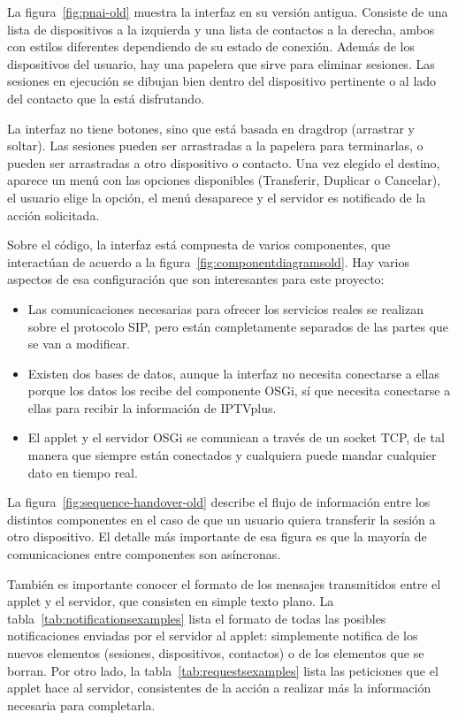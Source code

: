 La figura~\ref{fig:pnai-old} muestra la interfaz en su versión antigua.
Consiste de una lista de dispositivos a la izquierda y una lista de contactos a la derecha, ambos con estilos diferentes dependiendo de su estado de conexión.
Además de los dispositivos del usuario, hay una papelera que sirve para eliminar sesiones.
Las sesiones en ejecución se dibujan bien dentro del dispositivo pertinente o al lado del contacto que la está disfrutando.

La interfaz no tiene botones, sino que está basada en drag\et{}drop (arrastrar y soltar).
Las sesiones pueden ser arrastradas a la papelera para terminarlas, o pueden ser arrastradas a otro dispositivo o contacto.
Una vez elegido el destino, aparece un menú con las opciones disponibles (Transferir, Duplicar o Cancelar), el usuario elige la opción, el menú desaparece y el servidor es notificado de la acción solicitada.

Sobre el código, la interfaz está compuesta de varios componentes, que interactúan de acuerdo a la figura~\ref{fig:componentdiagramsold}.
Hay varios aspectos de esa configuración que son interesantes para este proyecto:

\begin{itemize}
  \item Las comunicaciones necesarias para ofrecer los servicios reales se realizan sobre el protocolo SIP, pero están completamente separados de las partes que se van a modificar.
  \item Existen dos bases de datos, aunque la interfaz no necesita conectarse a ellas porque los datos los recibe del componente OSGi, sí que necesita conectarse a ellas para recibir la información de IPTVplus.
  \item El applet y el servidor OSGi se comunican a través de un socket TCP, de tal manera que siempre están conectados y cualquiera puede mandar cualquier dato en tiempo real.
\end{itemize}

La figura~\ref{fig:sequence-handover-old} describe el flujo de información entre los distintos componentes en el caso de que un usuario quiera transferir la sesión a otro dispositivo.
El detalle más importante de esa figura es que la mayoría de comunicaciones entre componentes son asíncronas.

También es importante conocer el formato de los mensajes transmitidos entre el applet y el servidor, que consisten en simple texto plano. La tabla~\ref{tab:notificationsexamples} lista el formato de todas las posibles notificaciones enviadas por el servidor al applet: simplemente notifica de los nuevos elementos (sesiones, dispositivos, contactos) o de los elementos que se borran.
Por otro lado, la tabla~\ref{tab:requestsexamples} lista las peticiones que el applet hace al servidor, consistentes de la acción a realizar más la información necesaria para completarla.

